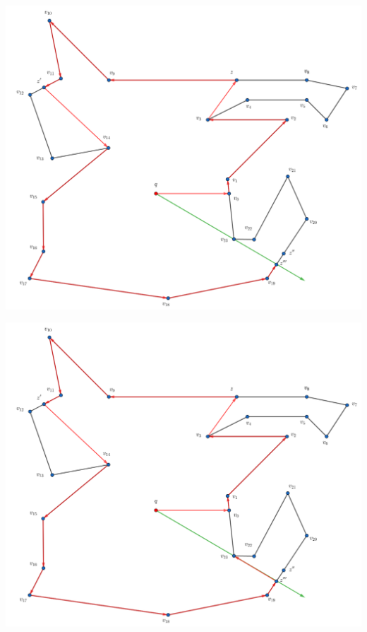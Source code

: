 \begin{frame}
  \centering \includegraphics[width=0.70 \paperwidth]{images/Ejecucion/e38.png}
\end{frame}

\begin{frame}
  \centering \includegraphics[width=0.70 \paperwidth]{images/Ejecucion/e39.png}
\end{frame}

